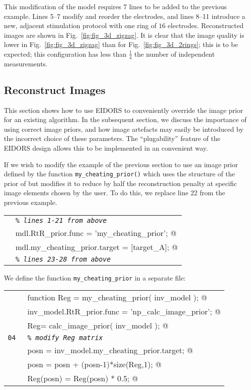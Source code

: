 \documentclass[12pt]{iopart}
\makeatletter
\newcommand{\CODEstart}{\medskip\begin{tabular}{ll}}
\newcommand{\CN}{\tt\scriptsize} %
\newcommand{\CC}{&\small\verb@}   % start code
\newcommand{\CI}{&\small\tt\em}   % start code
\newcommand{\CODEend}{\end{tabular}\medskip}
\makeatother
\begin{document}
This modification of the model requires 7 lines to be added
to the previous example. Lines 5--7 modify and reorder the
electrodes, and lines 8--11 introduce a new, adjacent
stimulation protocol with one ring of $16$ electrodes. Reconstructed
images are shown in Fig.~\ref{fig:fig_3d_zigzag}.
It is clear that the image quality is lower in Fig.~\ref{fig:fig_3d_zigzag}
than for Fig.~\ref{fig:fig_3d_2rings}; this is to be expected;
this configuration
has less than $\frac{1}{4}$ the number of independent measurements.
 

\subsection{  Reconstruct Images }

This section shows how to use EIDORS to conveniently
override the image prior
for an existing algorithm. In the subsequent section,
we discuss the importance of using correct image priors,
and how image artefacts may easily be introduced by the incorrect
choice of these parameters. The ``plugability'' feature of the
EIDORS design allows this to be implemented in an convenient way.

If we wish to modify the example of the previous section
to use an image prior defined by the function
{\tt my\_cheating\_prior()} which uses the structure of the
prior of \cite{Polydorides_2002} but modifies it to reduce
by half the reconstruction penalty at specific image elements chosen by
the user. To do this, we replace line 22 from the previous
example.

\CODEstart
\CN    \CI \% lines 1-21 from above \\[-3pt]
\CN    \CC mdl.RtR_prior.func               = 'my_cheating_prior'; @\\[-3pt]
\CN    \CC mdl.my_cheating_prior.target = [target_A]; @\\[-3pt]
\CN    \CI \% lines 23-28 from above \\[-3pt]
\CODEend

We define the function {\tt my\_cheating\_prior} in a separate file:

\CODEstart
\CN    \CC function Reg = my_cheating_prior( inv_model ); @\\[-3pt]
\CN    \CC   inv_model.RtR_prior.func = 'np_calc_image_prior'; @\\[-3pt]
\CN    \CC   Reg= calc_image_prior( inv_model ); @\\[-3pt]
\CN 04 \CI   \% modify Reg matrix \\[-3pt]
\CN    \CC   posn = inv_model.my_cheating_prior.target; @\\[-3pt]
\CN    \CC   posn = posn + (posn-1)*size(Reg,1); @\\[-3pt]
\CN    \CC   Reg(posn) = Reg(posn) * 0.5; @\\[-3pt]
\CODEend
\end{document}
